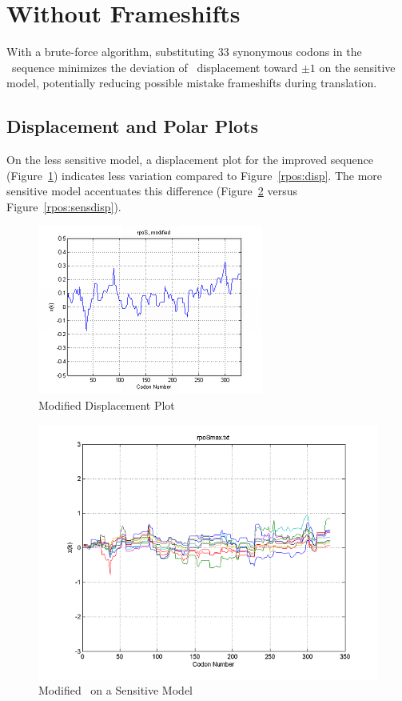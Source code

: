 \documentclass[10pt,twocolumn]{article}
\begin{document}
\section{Without Frameshifts}

With a brute-force algorithm, substituting 33 synonymous codons in the \rpoS\ sequence minimizes
the deviation of \rpoS\ displacement toward $\pm 1$ on the sensitive model, potentially reducing
possible mistake frameshifts during translation.

\subsection{Displacement and Polar Plots}

On the less sensitive model, a displacement plot for the improved sequence (Figure~\ref{rposmax:disp})
indicates less variation compared to Figure~\ref{rpos:disp}. The more sensitive model accentuates this
difference (Figure~\ref{rposmax:sensdisp} versus Figure~\ref{rpos:sensdisp}).

\begin{figure}[htp]
    \centering
    \caption{Modified \rpoS Displacement Plot}
    \label{rposmax:disp}
    \includegraphics[scale=1]{rpoS/max.png}
\end{figure}

\begin{figure}[htp]
    \centering
    \caption{Modified \rpoS\ on a Sensitive Model}
    \label{rposmax:sensdisp}
    \includegraphics[scale=0.7]{rpoS/max-sensitive.png}
\end{figure}
\end{document}
